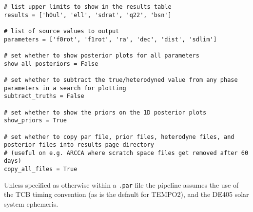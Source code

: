 \begin{lstlisting}[frame=single]
# list upper limits to show in the results table
results = ['h0ul', 'ell', 'sdrat', 'q22', 'bsn']

# list of source values to output
parameters = ['f0rot', 'f1rot', 'ra', 'dec', 'dist', 'sdlim']

# set whether to show posterior plots for all parameters
show_all_posteriors = False

# set whether to subtract the true/heterodyned value from any phase parameters in a search for plotting
subtract_truths = False

# set whether to show the priors on the 1D posterior plots
show_priors = True

# set whether to copy par file, prior files, heterodyne files, and posterior files into results page directory
# (useful on e.g. ARCCA where scratch space files get removed after 60 days)
copy_all_files = True
\end{lstlisting}

Unless specified as otherwise within a {\tt .par} file the pipeline assumes the use of the TCB timing convention (as is the default for TEMPO2), and the DE405
solar system ephemeris.


